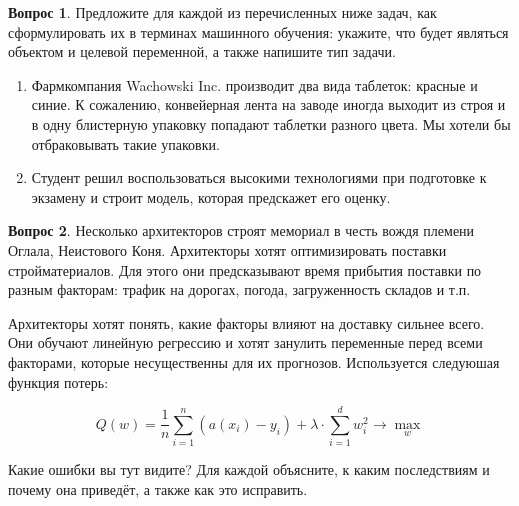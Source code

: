 \documentclass[12pt]{article}
\theoremstyle{definition}
\newtheorem{question}{Вопрос}
\begin{document}
\begin{question}
Предложите для каждой из перечисленных ниже задач, как сформулировать их в терминах машинного обучения: укажите, что будет являться объектом и целевой переменной, а также напишите тип задачи.

\begin{enumerate}
    \item Фармкомпания Wachowski Inc. производит два вида таблеток: красные и синие. К сожалению, конвейерная лента на заводе иногда выходит из строя и в одну блистерную упаковку попадают таблетки разного цвета. Мы хотели бы отбраковывать такие упаковки.
    
  \item Студент решил воспользоваться высокими технологиями при подготовке к экзамену и строит модель, которая предскажет его оценку.
\end{enumerate}
\end{question}


\vspace{4cm} 


\begin{question}
Несколько архитекторов строят мемориал в честь вождя племени Оглала, Неистового Коня. Архитекторы хотят оптимизировать поставки стройматериалов. Для этого они предсказывают время прибытия поставки по разным факторам: трафик на дорогах, погода, загруженность складов и т.п. 

Архитекторы хотят понять, какие факторы влияют на доставку сильнее всего. Они обучают линейную регрессию и хотят занулить переменные перед всеми факторами, которые несущественны для их прогнозов. Используется следуюшая функция потерь:

$$
Q(w) = \frac{1}{n} \sum_{i=1}^n (a(x_i) - y_i) + \lambda \cdot \sum_{i=1}^d w_i^2 \to \max_{w}
$$

Какие ошибки вы тут видите? Для каждой объясните, к каким последствиям и почему она приведёт, а также как это исправить.
\end{question}



\newpage 
\end{document}
